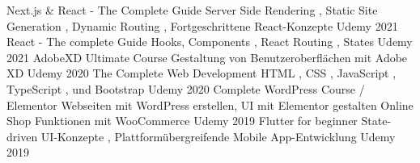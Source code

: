 
\begin{cvhonors}
\cvhonor
  {Next.js \& React - The Complete Guide} %
  {
    Server Side Rendering , Static Site Generation , Dynamic Routing , Fortgeschrittene React-Konzepte
  } %
  {Udemy} %
  {2021} %
\cvhonor
  {React - The complete Guide} %
  {
    Hooks, Components , React Routing , States
  } %
  {Udemy} %
  {2021} %
\cvhonor
  {AdobeXD Ultimate Course} %
  {
    Gestaltung von Benutzeroberflächen mit Adobe XD
  } %
  {Udemy} %
  {2020} %
\cvhonor
  {The Complete Web Development} %
  {
    HTML , CSS , JavaScript , TypeScript , und Bootstrap
  } %
  {Udemy} %
  {2020} %
\cvhonor
  {Complete WordPress Course / Elementor} %
  {
    Webseiten mit WordPress erstellen, UI mit Elementor gestalten \newline Online Shop Funktionen mit WooCommerce
  } %
  {Udemy} %
  {2019} %
\cvhonor
  {Flutter for beginner} %
  {
    State-driven UI-Konzepte , Plattformübergreifende Mobile App-Entwicklung
  } %
  {Udemy} %
  {2019} %
\end{cvhonors}
